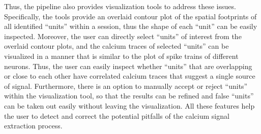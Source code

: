 \documentclass[master.tex]{subfiles}
\begin{document}
Thus, the pipeline also provides visualization tools to address these issues.
Specifically, the tools provide an overlaid contour plot of the spatial
footprints of all identified ``units'' within a session, thus the shape of each
``unit'' can be easily inspected. Moreover, the user can directly select
``units'' of interest from the overlaid contour plots, and the calcium traces of
selected ``units'' can be visualized in a manner that is similar to the plot of
spike trains of different neurons. Thus, the user can easily inspect whether
``units'' that are overlapping or close to each other have correlated calcium
traces that suggest a single source of signal. Furthermore, there is an option
to manually accept or reject ``units'' within the visualization tool, so that
the results can be refined and false ``units'' can be taken out easily without
leaving the visualization. All these features help the user to detect and
correct the potential pitfalls of the calcium signal extraction process.
\end{document}
